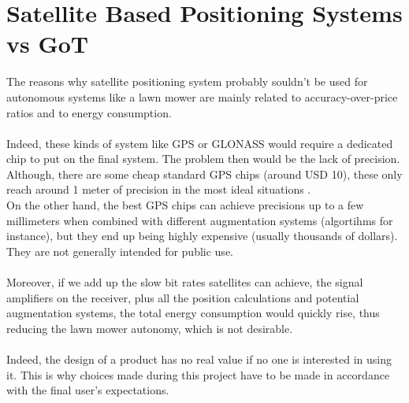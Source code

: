 \section{Satellite Based Positioning Systems vs GoT}
The reasons why satellite positioning system probably souldn't be used for autonomous systems like a lawn mower are mainly related to accuracy-over-price ratios and to energy consumption.\\\\
Indeed, these kinds of system like GPS or GLONASS would require a dedicated chip to put on the final system. The problem then would be the lack of precision. Although, there are some cheap standard GPS chips (around USD 10), these only reach around 1 meter of precision in the most ideal situations \cite{GPSUSWebsiteAccuracy,Miller}. \\
On the other hand, the best GPS chips can achieve precisions up to a few millimeters \cite{GPSUSWebsiteAccuracy} when combined with different augmentation systems (algortihms for instance), but they end up being highly expensive (usually thousands of dollars). They are not generally intended for public use.
 \\\\
%
Moreover, if we add up the slow bit rates satellites can achieve, the signal amplifiers on the receiver, plus all the position calculations and potential augmentation systems, the total energy consumption would quickly rise,  thus reducing the lawn mower autonomy, which is not desirable.\\\\
%
Indeed, the design of a product has no real value if no one is interested in using it. This is why choices made during this project have to be made in accordance with the final user's expectations.